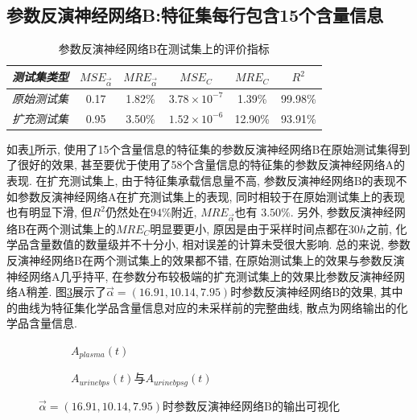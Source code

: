 \documentclass[a4paper,punct=banjiao,twoside]{ctexrep}
\theoremstyle{plain}
\theoremstyle{definition}
\theoremstyle{remark}
\begin{document}
\subsection*{参数反演神经网络B:特征集每行包含15个含量信息}

\begin{table}[htbp]
  \centering
  \begin{tabular}[t]{l*{5}{c}}
    \hline
    \textit{测试集类型} &$MSE_{\vec{\alpha}}$&$MRE_{\vec{\alpha}}$ & $MSE_{C}$& $MRE_{C}$& $R^2$\\
    \hline
    \textit{原始测试集} &  0.17  &   1.82\%     &   $3.78\times 10^{-7}$     &  1.39\%     &  99.98\%  \\ 
    \textit{扩充测试集} &  0.95  &   3.50\%     &   $1.52\times 10^{-6}$     &  12.90\%     & 93.91\%  \\ 
    \hline
  \end{tabular}
  \caption{\label{tab4.2}参数反演神经网络B在测试集上的评价指标} 
\end{table}  

如表\ref{tab4.2}所示, 使用了15个含量信息的特征集的参数反演神经网络B在原始测试集得到了很好的效果, 甚至要优于使用了58个含量信息的特征集的参数反演神经网络A的表现. 
在扩充测试集上, 由于特征集承载信息量不高, 参数反演神经网络B的表现不如参数反演神经网络A在扩充测试集上的表现, 同时相较于在原始测试集上的表现也有明显下滑, 但$R^2$仍然处在$94\%$附近, $MRE_{\vec{\alpha}}$也有
$3.50\%$. 
另外, 参数反演神经网络B在两个测试集上的$MRE_{C}$明显要更小, 原因是由于采样时间点都在$30h$之前, 化学品含量数值的数量级并不十分小, 相对误差的计算未受很大影响.
总的来说, 参数反演神经网络B在两个测试集上的效果都不错, 在原始测试集上的效果与参数反演神经网络A几乎持平, 在参数分布较极端的扩充测试集上的效果比参数反演神经网络A稍差.
图\ref{反演B}展示了$\vec{\alpha}=(16.91,10.14,7.95)$时参数反演神经网络B的效果, 其中的曲线为特征集化学品含量信息对应的未采样前的完整曲线, 散点为网络输出的化学品含量信息.
\begin{figure}[H]
  \centering
  \begin{subfigure}{0.45\textwidth}
    \centering
    \resizebox{1\textwidth}{!}{}
    \caption{$A_{plasma}(t)$}
    \label{反演B1}
  \end{subfigure}
  \begin{subfigure}{0.45\textwidth}
    \centering
    \resizebox{1\textwidth}{!}{}
    \caption{$A_{urinebps}(t)$与$A_{urinebpsg}(t)$}
    \label{反演B2}
  \end{subfigure}
  \caption{$\vec{\alpha}=(16.91,10.14,7.95)$时参数反演神经网络B的输出可视化}
  \label{反演B}
\end{figure}
\end{document}
